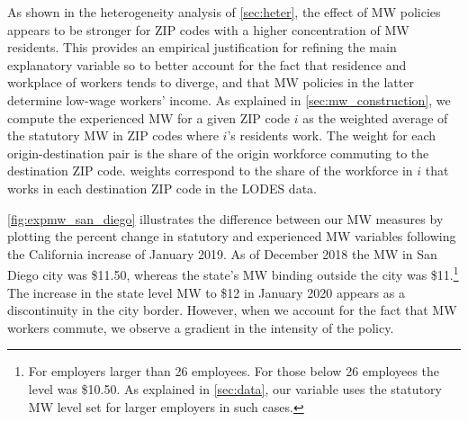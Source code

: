As shown in the heterogeneity analysis of \autoref{sec:heter}, the effect of MW policies 
appears to be stronger for ZIP codes with a higher concentration of MW residents. This 
provides an empirical justification for refining the main explanatory variable so to 
better account for the fact that residence and workplace of workers tends to diverge, 
and that MW policies in the latter determine low-wage workers' income. As explained in 
\autoref{sec:mw_construction}, we compute the experienced MW for a given ZIP code $i$ as 
the weighted average of the statutory MW in ZIP codes where $i$'s residents  work.
The weight for each origin-destination pair is the share of the origin workforce commuting to
the destination ZIP code. weights correspond to the share of the workforce in $i$ that works in 
each destination ZIP code in the LODES data.

\autoref{fig:expmw_san_diego} illustrates the difference between our MW measures by plotting 
the percent change in statutory and experienced MW variables following the California 
increase of January 2019. As of December 2018 the MW in San Diego city was \$11.50, whereas 
the state's MW binding outside the city was \$11.\footnote{For employers larger than 26 
	employees. For those below 26 employees the level was \$10.50. As explained in 
	\autoref{sec:data}, our variable uses the statutory MW level set for larger employers 
	in such cases.}
The increase in the state level MW to \$12 in January 2020 appears as a discontinuity in the 
city border. However, when we account for the fact that MW workers commute, we observe a 
gradient in the intensity of the policy.

